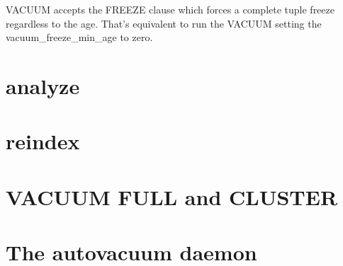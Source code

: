 VACUUM accepts the FREEZE  clause which forces a complete tuple freeze 
regardless to the age. That's equivalent to run the VACUUM setting the vacuum\_freeze\_min\_age to 
zero.


\section{analyze}
\label{sec:ANALYZE}


\section{reindex}
\begin{comment}
  . A B-tree index is a tree of 
table's implementation, An index is The tuples moving across the data files is the index entries 
shall be updated. A B-tree index entry basically carries the indexed value with the pointer to the 
page containing the tuple. When the tupe change page the index entry shall be updated. This require 
\end{comment}

\section{VACUUM FULL and CLUSTER}


\section{The autovacuum daemon}
\label{sec:AUTOVACUUM}